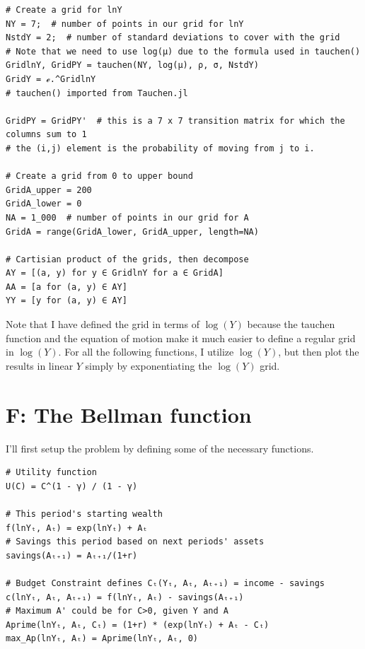 \documentclass[12pt]{article}
\begin{document}
\begin{lstlisting}[language=JuliaLocal, style=julia]
# Create a grid for lnY
NY = 7;  # number of points in our grid for lnY
NstdY = 2;  # number of standard deviations to cover with the grid
# Note that we need to use log(μ) due to the formula used in tauchen()
GridlnY, GridPY = tauchen(NY, log(μ), ρ, σ, NstdY)
GridY = ℯ.^GridlnY
# tauchen() imported from Tauchen.jl

GridPY = GridPY'  # this is a 7 x 7 transition matrix for which the columns sum to 1
# the (i,j) element is the probability of moving from j to i.

# Create a grid from 0 to upper bound
GridA_upper = 200
GridA_lower = 0
NA = 1_000  # number of points in our grid for A
GridA = range(GridA_lower, GridA_upper, length=NA)

# Cartisian product of the grids, then decompose
AY = [(a, y) for y ∈ GridlnY for a ∈ GridA]
AA = [a for (a, y) ∈ AY]
YY = [y for (a, y) ∈ AY]
\end{lstlisting}
Note that I have defined the grid in terms of $\log(Y)$ because the tauchen function and the equation of motion make it much easier to define a regular grid in $\log(Y)$. For all the following functions, I utilize $\log(Y)$, but then plot the results in linear $Y$ simply by exponentiating the $\log(Y)$ grid.










\newpage
\section*{F: The Bellman function}

I'll first setup the problem by defining some of the necessary functions.

\begin{lstlisting}[language=JuliaLocal, style=julia]
# Utility function
U(C) = C^(1 - γ) / (1 - γ)

# This period's starting wealth
f(lnYₜ, Aₜ) = exp(lnYₜ) + Aₜ
# Savings this period based on next periods' assets
savings(Aₜ₊₁) = Aₜ₊₁/(1+r)

# Budget Constraint defines Cₜ(Yₜ, Aₜ, Aₜ₊₁) = income - savings
c(lnYₜ, Aₜ, Aₜ₊₁) = f(lnYₜ, Aₜ) - savings(Aₜ₊₁)
# Maximum A' could be for C>0, given Y and A
Aprime(lnYₜ, Aₜ, Cₜ) = (1+r) * (exp(lnYₜ) + Aₜ - Cₜ)
max_Ap(lnYₜ, Aₜ) = Aprime(lnYₜ, Aₜ, 0)
\end{lstlisting}
\end{document}
